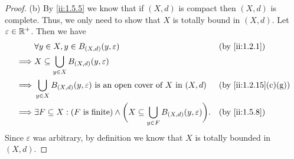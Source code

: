 \begin{proof}{(b)}
  By \cref{ii:1.5.5} we know that if \((X, d)\) is compact then \((X, d)\) is complete.
  Thus, we only need to show that \(X\) is totally bound in \((X, d)\).
  Let \(\varepsilon \in \mathbb{R}^+\).
  Then we have
  \begin{align*}
             & \forall y \in X, y \in B_{(X, d)}(y, \varepsilon)                                                                         &  & \by{ii:1.2.1}       \\
    \implies & X \subseteq \bigcup_{y \in X} B_{(X, d)}(y, \varepsilon)                                                                                           \\
    \implies & \bigcup_{y \in X} B_{(X, d)}(y, \varepsilon) \text{ is an open cover of } X \text{ in } (X, d)                            &  & \by{ii:1.2.15}[c,g] \\
    \implies & \exists F \subseteq X : (F \text{ is finite}) \land \bigg(X \subseteq \bigcup_{y \in F} B_{(X, d)}(y, \varepsilon)\bigg). &  & \by{ii:1.5.8}
  \end{align*}
  Since \(\varepsilon\) was arbitrary, by definition we know that \(X\) is totally bounded in \((X, d)\).
\end{proof}

